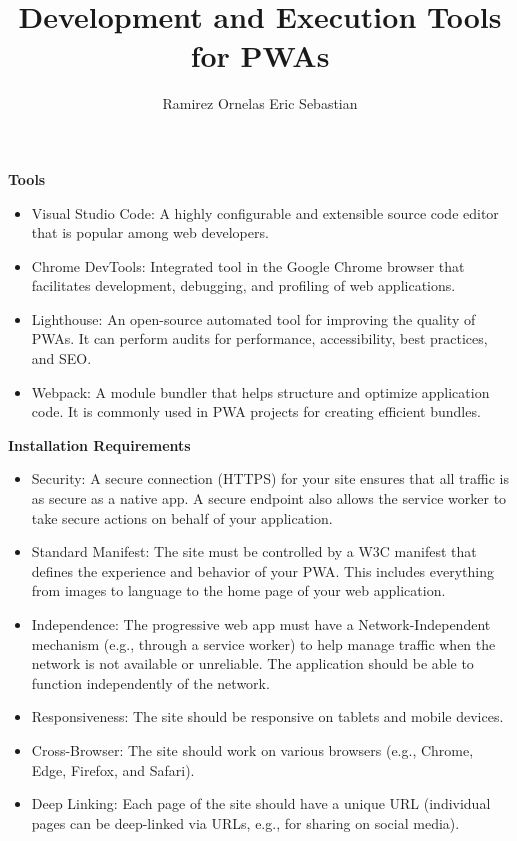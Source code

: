 \documentclass[10pt,a4paper]{article}
\title{Development and Execution Tools for PWAs}
\author{Ramirez Ornelas Eric Sebastian}
\begin{document}
	\maketitle
	\textbf{Tools}
	\begin{itemize}
		\item Visual Studio Code: A highly configurable and extensible source code editor that is popular among web developers.
		\item Chrome DevTools: Integrated tool in the Google Chrome browser that facilitates development, debugging, and profiling of web applications.
		\item Lighthouse: An open-source automated tool for improving the quality of PWAs. It can perform audits for performance, accessibility, best practices, and SEO.
		\item Webpack: A module bundler that helps structure and optimize application code. It is commonly used in PWA projects for creating efficient bundles.
	\end{itemize}
	
	\textbf{Installation Requirements}
	\begin{itemize}
		\item Security: A secure connection (HTTPS) for your site ensures that all traffic is as secure as a native app. A secure endpoint also allows the service worker to take secure actions on behalf of your application.
		\item Standard Manifest: The site must be controlled by a W3C manifest that defines the experience and behavior of your PWA. This includes everything from images to language to the home page of your web application.
		\item Independence: The progressive web app must have a Network-Independent mechanism (e.g., through a service worker) to help manage traffic when the network is not available or unreliable. The application should be able to function independently of the network.
		\item Responsiveness: The site should be responsive on tablets and mobile devices.
		\item Cross-Browser: The site should work on various browsers (e.g., Chrome, Edge, Firefox, and Safari).
		\item Deep Linking: Each page of the site should have a unique URL (individual pages can be deep-linked via URLs, e.g., for sharing on social media).
	\end{itemize}
\end{document}
